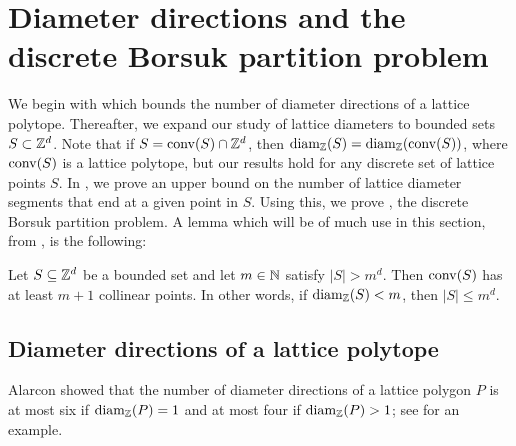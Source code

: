 \section{Diameter directions and the discrete Borsuk partition problem} \label{sec:directions-Borsuk}

We begin with  which bounds the number of diameter directions of a lattice polytope. Thereafter, we expand our study of lattice diameters to bounded sets $S \subset \mathbb{Z}^d$. Note that if $S = \operatorname{conv}(S) \cap \mathbb{Z}^d$, then $\operatorname{diam_{\mathbb{Z}}}(S)=\operatorname{diam_{\mathbb{Z}}}(\operatorname{conv} (S))$, where $\operatorname{conv} (S)$ is a lattice polytope, but our results hold for any discrete set of lattice points $S$. In , we prove an upper bound on the number of lattice diameter segments that end at a given point in $S$. Using this, we prove , the discrete Borsuk partition problem. A lemma which will be of much use in this section, from \cite{rabi89}, is the following:

\begin{lemma}[Rabinowitz, 1989]\label{lemma:Rabinowitz}
    Let $S \subseteq \mathbb{Z}^d$ be a bounded set and let $m \in \mathbb{N}$ satisfy $|S| > m^d$. Then $\operatorname{conv} (S)$ has at least $m+1$ collinear points. In other words, if $\operatorname{diam_{\mathbb{Z}}}(S)<m$, then $|S| \leq  m^d$.
\end{lemma}


\subsection{Diameter directions of a lattice polytope}

Alarcon \cite[Theorem~4.1]{Alarcon_PhD} showed that the number of diameter directions of a lattice polygon $P$ is at most six if $\operatorname{diam_{\mathbb{Z}}}(P)=1$ and at most four if $\operatorname{diam_{\mathbb{Z}}}(P)>1$; see  for an example.


